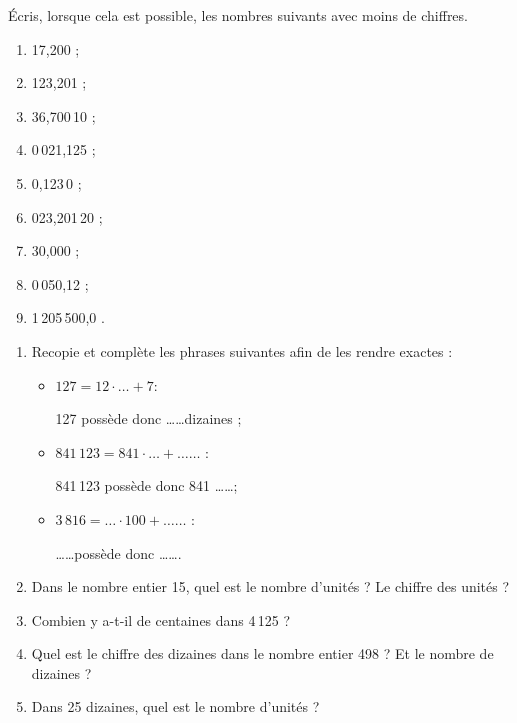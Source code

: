 \begin{exercice}
Écris, lorsque cela est possible, les nombres suivants avec moins de chiffres.
\begin{enumerate} 
 \item 17,200 \dotfill ; 
 
 \item 123,201 \dotfill ; 
  
 \item 36,700\,10 \dotfill ; 
 
 \item 0\,021,125 \dotfill ; 
 
 \item 0,123\,0 \dotfill ; 
 
 \item 023,201\,20 \dotfill ; 
 
 \item 30,000 \dotfill ; 
 
 \item 0\,050,12 \dotfill ; 
 
 \item 1\,205\,500,0 \dotfill. 
  
 \end{enumerate}
\end{exercice}

\begin{exercice}
\begin{enumerate}
 \item Recopie et complète les phrases suivantes afin de les rendre exactes :
 \begin{itemize}
  \item $127 = 12 \cdot \ldots + 7$:
  
  127 possède donc \ldots \ldots dizaines ;
  \item $841\,123 = 841 \cdot \ldots + \ldots \ldots$ :
  
  841\,123 possède donc 841 \ldots \ldots ;
  \item $3\,816 = \ldots \cdot 100 + \ldots \ldots$ :
  
  \ldots \ldots possède donc \ldots \ldots .
  \end{itemize}
 \item Dans le nombre entier 15, quel est le nombre d'unités ? Le chiffre des unités ?
 \item Combien y a-t-il de centaines dans 4\,125 ?
 \item Quel est le chiffre des dizaines dans le nombre entier 498 ? Et le nombre de dizaines ?
 \item Dans 25 dizaines, quel est le nombre d'unités ?
 \end{enumerate}
\end{exercice}


